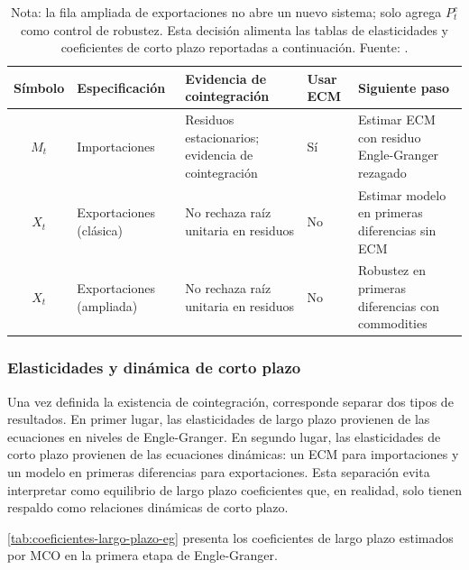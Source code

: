 \documentclass[11pt,a4paper]{article}
\begin{document}
	\begin{table}[H]
		\centering
		\caption{Decisión operativa Engle-Granger.}
		\label{tab:decision-engle-granger}
		\small
		\begin{tabular}{clp{4.0cm}lp{4.3cm}}
			\toprule
			Símbolo & Especificación & Evidencia de cointegración & Usar ECM & Siguiente paso \\
			\midrule
			\(M_t\) & Importaciones &
			Residuos estacionarios; evidencia de cointegración &
			Sí &
			Estimar ECM con residuo Engle-Granger rezagado \\
			\(X_t\) & Exportaciones (clásica) &
			No rechaza raíz unitaria en residuos &
			No &
			Estimar modelo en primeras diferencias sin ECM \\
			\(X_t\) & Exportaciones (ampliada) &
			No rechaza raíz unitaria en residuos &
			No &
			Robustez en primeras diferencias con commodities \\
			\bottomrule
		\end{tabular}
		\caption*{\footnotesize Nota: la fila ampliada de exportaciones no abre un nuevo
			sistema; solo agrega \(P_t^c\) como control de robustez. Esta decisión alimenta
			las tablas de elasticidades y coeficientes de corto plazo reportadas a
			continuación. Fuente:
			.}
	\end{table}

	\subsubsection{Elasticidades y dinámica de corto plazo}
	\label{subsubsec:eg-elasticidades-corto-plazo}

	Una vez definida la existencia de cointegración, corresponde separar dos tipos
	de resultados. En primer lugar, las elasticidades de largo plazo provienen de
	las ecuaciones en niveles de Engle-Granger. En segundo lugar, las elasticidades
	de corto plazo provienen de las ecuaciones dinámicas: un ECM para importaciones
	y un modelo en primeras diferencias para exportaciones. Esta separación evita
	interpretar como equilibrio de largo plazo coeficientes que, en realidad, solo
	tienen respaldo como relaciones dinámicas de corto plazo.

	\autoref{tab:coeficientes-largo-plazo-eg} presenta los coeficientes de largo
	plazo estimados por MCO en la primera etapa de Engle-Granger.
\end{document}
